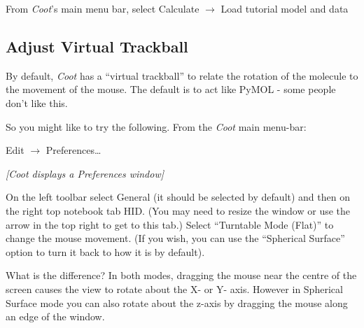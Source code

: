 \documentclass{article}
\begin{document}
From \emph{Coot}'s main menu bar, select
\textsf{Calculate $\rightarrow$ Load tutorial model and data}



\subsection{Adjust Virtual Trackball}
By default, \emph{Coot} has a ``virtual trackball'' to relate the
rotation of the molecule to the movement of the mouse.  The default is
to act like PyMOL - some people don't like this.

So you might like to try the following. From the \emph{Coot} main menu-bar:

\textsf{Edit $\rightarrow$ Preferences\ldots}

\textsl{  [\emph{Coot} displays a Preferences window]}

On the left toolbar select \textsf{General} (it should be selected by
default) and then on the right top notebook tab \textsf{HID}. (You may
need to resize the window or use the arrow in the top right to get to
this tab.)  Select \textsf{``Turntable Mode (Flat)''} to change the
mouse movement. (If you wish, you can use the \textsf{``Spherical
  Surface''} option to turn it back to how it is by default).

What is the difference?
In both modes, dragging the mouse near the centre of the screen causes
the view to rotate about the X- or Y- axis. However in Spherical Surface mode
you can also rotate about the z-axis by dragging the mouse along an
edge of the window.


\end{document}
